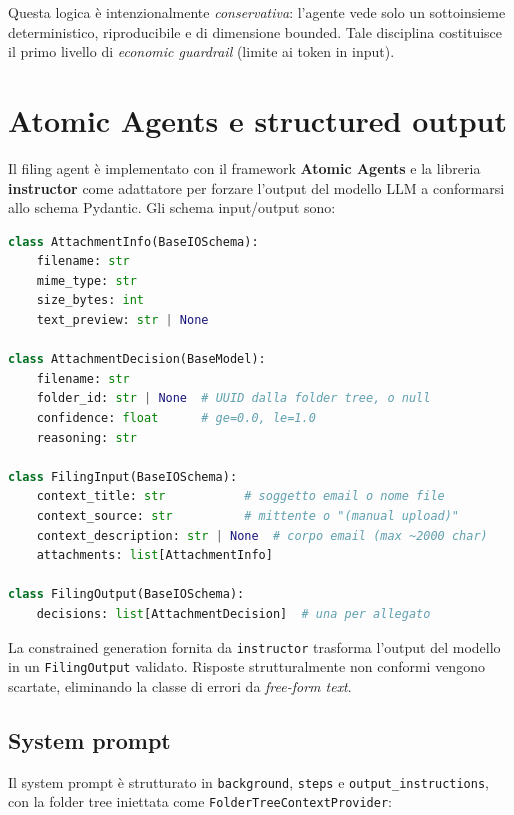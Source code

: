 Questa logica \`e intenzionalmente \emph{conservativa}: l'agente vede solo un sottoinsieme
deterministico, riproducibile e di dimensione bounded. Tale disciplina costituisce il
primo livello di \emph{economic guardrail} (limite ai token in input).

\section{Atomic Agents e structured output}
\label{sec:atomic_agents}

Il filing agent \`e implementato con il framework \textbf{Atomic Agents} e la libreria
\textbf{instructor} come adattatore per forzare l'output del modello LLM a conformarsi
allo schema Pydantic. Gli schema input/output sono:

\begin{lstlisting}[language=Python, caption={Schema input e output del filing agent (\texttt{agent\_worker/agent.py}).}]
class AttachmentInfo(BaseIOSchema):
    filename: str
    mime_type: str
    size_bytes: int
    text_preview: str | None

class AttachmentDecision(BaseModel):
    filename: str
    folder_id: str | None  # UUID dalla folder tree, o null
    confidence: float      # ge=0.0, le=1.0
    reasoning: str

class FilingInput(BaseIOSchema):
    context_title: str           # soggetto email o nome file
    context_source: str          # mittente o "(manual upload)"
    context_description: str | None  # corpo email (max ~2000 char)
    attachments: list[AttachmentInfo]

class FilingOutput(BaseIOSchema):
    decisions: list[AttachmentDecision]  # una per allegato
\end{lstlisting}

La constrained generation fornita da \texttt{instructor} trasforma l'output del modello
in un \texttt{FilingOutput} validato. Risposte strutturalmente non conformi vengono
scartate, eliminando la classe di errori da \emph{free-form text}.

\subsection{System prompt}

Il system prompt \`e strutturato in \texttt{background}, \texttt{steps} e
\texttt{output\_instructions}, con la folder tree iniettata come
\texttt{FolderTreeContextProvider}:

